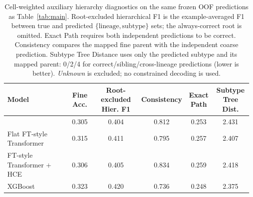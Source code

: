 \begin{table}[H]
\centering
\small
\setlength{\tabcolsep}{7pt}
\renewcommand{\arraystretch}{1.10}
\begin{tabular}{lccccc}
\toprule
\textbf{Model} & \textbf{Fine Acc.} & \makecell{Root-excluded\\Hier. F1} & \textbf{Consistency} & \makecell{Exact\\Path} & \makecell{Subtype\\Tree Dist.} \\
\midrule
\ourmethod{} & 0.305 & 0.404 & 0.812 & 0.253 & 2.431 \\
Flat FT-style Transformer & 0.315 & 0.411 & 0.795 & 0.257 & 2.407 \\
FT-style Transformer $+$ HCE & 0.306 & 0.405 & 0.834 & 0.259 & 2.418 \\
XGBoost & 0.323 & 0.420 & 0.736 & 0.248 & 2.375 \\
\bottomrule
\end{tabular}
\caption{Cell-weighted auxiliary hierarchy diagnostics on the same frozen OOF predictions as Table~\ref{tab:main}. Root-excluded hierarchical F1 is the example-averaged F1 between true and predicted $\{\text{lineage},\text{subtype}\}$ sets; the always-correct root is omitted. Exact Path requires both independent predictions to be correct. Consistency compares the mapped fine parent with the independent coarse prediction. Subtype Tree Distance uses only the predicted subtype and its mapped parent: 0/2/4 for correct/sibling/cross-lineage predictions (lower is better). \emph{Unknown} is excluded; no constrained decoding is used.}
\label{tab:consistency}
\end{table}
